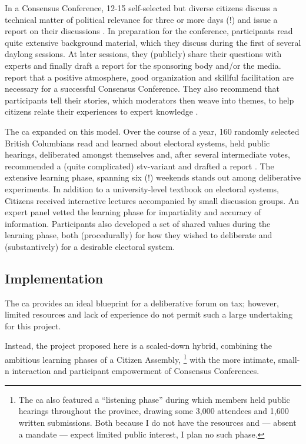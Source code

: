 In a Consensus Conference, 12-15 self-selected but diverse citizens discuss a technical matter of political relevance for three or more days (!) and issue a report on their discussions \citep{LeeKleinman2007}.
In preparation for the conference, participants read quite extensive background material, which they discuss during the first of several daylong sessions.
At later sessions, they (publicly) share their questions with experts and finally draft a report for the sponsoring body and/or the media.
\citeauthor{LeeKleinman2007} report that a positive atmosphere, good organization and skillful facilitation are necessary for a successful Consensus Conference.
They also recommend that participants tell their stories, which moderators then weave into themes, to help citizens relate their experiences to expert knowledge \citeyearpar[159]{LeeKleinman2007}.

The \gls{ca} expanded on this model.
Over the course of a year, 160 randomly selected British Columbians read and learned about electoral systems, held public hearings, deliberated amongst themselves and, after several intermediate votes, recommended a (quite complicated) \gls{stv}-variant and drafted a report \citep{Citizen-2004-aa}.
The extensive learning phase, spanning six (!) weekends stands out among deliberative experiments.
In addition to a university-level textbook on electoral systems, Citizens received interactive lectures accompanied by small discussion groups.
An expert panel vetted the learning phase for impartiality and accuracy of information.
Participants also developed a set of shared values during the learning phase, both (procedurally) for how they wished to deliberate and (substantively) for a desirable electoral system.

\subsection{Implementation}
The \gls{ca} provides an ideal blueprint for a deliberative forum on tax;
however, limited resources and lack of experience do not permit such a large undertaking for this project.

Instead, the project proposed here is a scaled-down hybrid, combining the ambitious learning phases of a Citizen Assembly,
\footnote{
	The \gls{ca} also featured a ``listening phase'' \citep[1609]{Pearse2008} during which members held public hearings throughout the province, drawing some 3,000 attendees and 1,600 written submissions.
	Both because I do not have the resources and --- absent a mandate --- expect limited public interest, I plan no such phase.
}
with the more intimate, small-n interaction and participant empowerment of Consensus Conferences.

